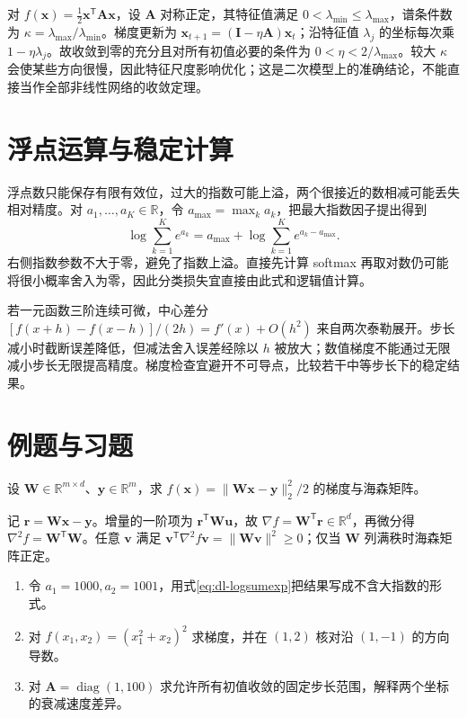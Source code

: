 \documentclass[UTF8,12pt,a4paper,fontset=fandol]{ctexbook}
\begin{document}
对 $f(\mathbf x)=\frac12\mathbf x^\mathsf T\mathbf A\mathbf x$，设 $\mathbf A$ 对称正定，其特征值满足 $0<\lambda_{\min}\leq\lambda_{\max}$，谱条件数为 $\kappa=\lambda_{\max}/\lambda_{\min}$。梯度更新为 $\mathbf x_{t+1}=(\mathbf I-\eta\mathbf A)\mathbf x_t$；沿特征值 $\lambda_j$ 的坐标每次乘 $1-\eta\lambda_j$。故收敛到零的充分且对所有初值必要的条件为 $0<\eta<2/\lambda_{\max}$。较大 $\kappa$ 会使某些方向很慢，因此特征尺度影响优化；这是二次模型上的准确结论，不能直接当作全部非线性网络的收敛定理。

\section{浮点运算与稳定计算}
浮点数只能保存有限有效位，过大的指数可能上溢，两个很接近的数相减可能丢失相对精度。对 $a_1,\ldots,a_K\in\mathbb R$，令 $a_{\max}=\max_ka_k$，把最大指数因子提出得到
\begin{equation}
\log\sum_{k=1}^Ke^{a_k}=a_{\max}+\log\sum_{k=1}^Ke^{a_k-a_{\max}}.
\label{eq:dl-logsumexp}
\end{equation}
右侧指数参数不大于零，避免了指数上溢。直接先计算 softmax 再取对数仍可能将很小概率舍入为零，因此分类损失宜直接由此式和逻辑值计算。

若一元函数三阶连续可微，中心差分 $[f(x+h)-f(x-h)]/(2h)=f'(x)+O(h^2)$ 来自两次泰勒展开。步长减小时截断误差降低，但减法舍入误差经除以 $h$ 被放大；数值梯度不能通过无限减小步长无限提高精度。梯度检查宜避开不可导点，比较若干中等步长下的稳定结果。

\section{例题与习题}
\begin{example}[平方损失的矩阵梯度]
设 $\mathbf W\in\mathbb R^{m\times d}$、$\mathbf y\in\mathbb R^m$，求 $f(\mathbf x)=\|\mathbf W\mathbf x-\mathbf y\|_2^2/2$ 的梯度与海森矩阵。
\end{example}
\begin{solve}
记 $\mathbf r=\mathbf W\mathbf x-\mathbf y$。增量的一阶项为 $\mathbf r^\mathsf T\mathbf W\mathbf u$，故 $\nabla f=\mathbf W^\mathsf T\mathbf r\in\mathbb R^d$，再微分得 $\nabla^2f=\mathbf W^\mathsf T\mathbf W$。任意 $\mathbf v$ 满足 $\mathbf v^\mathsf T\nabla^2f\mathbf v=\|\mathbf W\mathbf v\|^2\geq0$；仅当 $\mathbf W$ 列满秩时海森矩阵正定。
\end{solve}
\begin{enumerate}
\item 令 $a_1=1000,a_2=1001$，用式\eqref{eq:dl-logsumexp}把结果写成不含大指数的形式。
\item 对 $f(x_1,x_2)=(x_1^2+x_2)^2$ 求梯度，并在 $(1,2)$ 核对沿 $(1,-1)$ 的方向导数。
\item 对 $\mathbf A=\operatorname{diag}(1,100)$ 求允许所有初值收敛的固定步长范围，解释两个坐标的衰减速度差异。
\end{enumerate}
\end{document}
